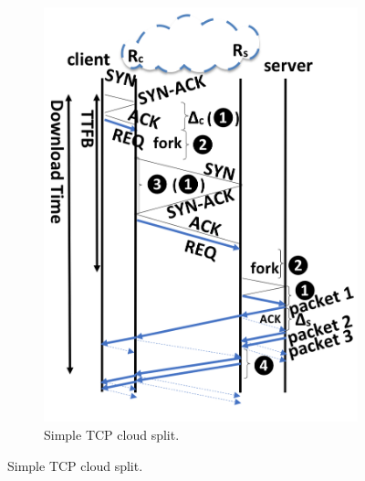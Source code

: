 \begin{figure}[!t]
\begin{subfigure}{0.65\columnwidth}
  \includegraphics[width=\columnwidth,clip]{figures/split.png}
    \caption{Simple TCP cloud split.} \label{fig:baseline}
\end{subfigure}

\end{figure}
